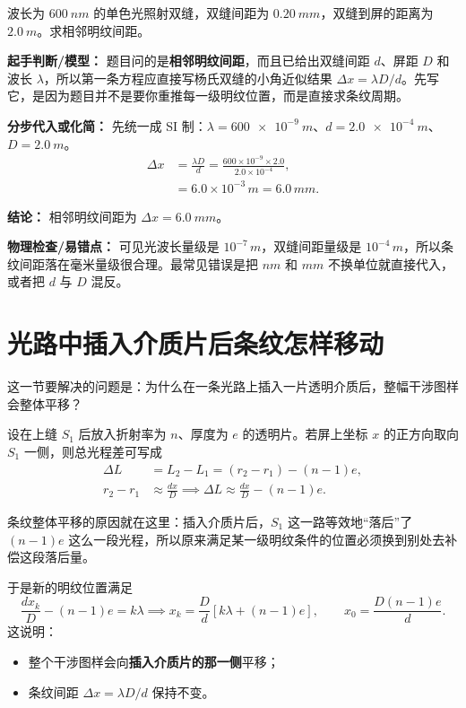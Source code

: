 \documentclass[lang=cn,11pt]{elegantbook}
\newcommand{\bridge}[1]{\begin{note}#1\end{note}}
\begin{document}
\begin{example}[双缝条纹间距]
波长为 \(\SI{600}{nm}\) 的单色光照射双缝，双缝间距为 \(\SI{0.20}{mm}\)，双缝到屏的距离为 \(\SI{2.0}{m}\)。求相邻明纹间距。
\end{example}

\begin{solution}
\textbf{起手判断/模型：} 题目问的是\textbf{相邻明纹间距}，而且已给出双缝间距 \(d\)、屏距 \(D\) 和波长 \(\lambda\)，所以第一条方程应直接写杨氏双缝的小角近似结果
\(\Delta x=\lambda D/d\)。先写它，是因为题目并不是要你重推每一级明纹位置，而是直接求条纹周期。

\textbf{分步代入或化简：} 先统一成 SI 制：\(\lambda=\SI{600e-9}{m}\)、\(d=\SI{2.0e-4}{m}\)、\(D=\SI{2.0}{m}\)。
\[
\begin{aligned}
\Delta x&=\frac{\lambda D}{d}
=\frac{600\times10^{-9}\times2.0}{2.0\times10^{-4}},\\
&=6.0\times10^{-3}\,\si{m}
=6.0\,\si{mm}.
\end{aligned}
\]

\textbf{结论：} 相邻明纹间距为 \(\Delta x=\SI{6.0}{mm}\)。

\textbf{物理检查/易错点：} 可见光波长量级是 \(10^{-7}\,\si{m}\)，双缝间距量级是 \(10^{-4}\,\si{m}\)，所以条纹间距落在毫米量级很合理。最常见错误是把 \(\si{nm}\) 和 \(\si{mm}\) 不换单位就直接代入，或者把 \(d\) 与 \(D\) 混反。
\end{solution}

\section{光路中插入介质片后条纹怎样移动}

这一节要解决的问题是：为什么在一条光路上插入一片透明介质后，整幅干涉图样会整体平移？

设在上缝 \(S_1\) 后放入折射率为 \(n\)、厚度为 \(e\) 的透明片。若屏上坐标 \(x\) 的正方向取向 \(S_1\) 一侧，则总光程差可写成
\[
\begin{aligned}
\Delta L&=L_2-L_1=(r_2-r_1)-(n-1)e,\\
r_2-r_1&\approx \frac{dx}{D}
\implies
\Delta L\approx \frac{dx}{D}-(n-1)e.
\end{aligned}
\]

\bridge{条纹整体平移的原因就在这里：插入介质片后，\(S_1\) 这一路等效地“落后”了 \((n-1)e\) 这么一段光程，所以原来满足某一级明纹条件的位置必须换到别处去补偿这段落后量。}

于是新的明纹位置满足
\[
\frac{dx_k}{D}-(n-1)e=k\lambda
\implies
x_k=\frac{D}{d}\left[k\lambda+(n-1)e\right],\qquad
x_0=\frac{D(n-1)e}{d}.
\]
这说明：
\begin{itemize}
  \item 整个干涉图样会向\textbf{插入介质片的那一侧}平移；
  \item 条纹间距 \(\Delta x=\lambda D/d\) 保持不变。
\end{itemize}
\end{document}

